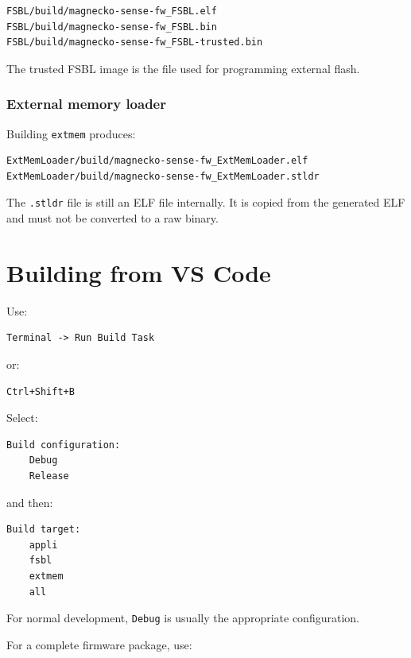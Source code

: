 \documentclass[10pt,a4paper,oneside]{report}
\begin{document}
\begin{verbatim}
FSBL/build/magnecko-sense-fw_FSBL.elf
FSBL/build/magnecko-sense-fw_FSBL.bin
FSBL/build/magnecko-sense-fw_FSBL-trusted.bin
\end{verbatim}

The trusted FSBL image is the file used for programming external flash.

\subsubsection{External memory loader}\label{wiki-getting-started-build-flash-debug--external-memory-loader}

Building \texttt{extmem} produces:

\begin{verbatim}
ExtMemLoader/build/magnecko-sense-fw_ExtMemLoader.elf
ExtMemLoader/build/magnecko-sense-fw_ExtMemLoader.stldr
\end{verbatim}

The \texttt{.\allowbreak{}stldr} file is still an ELF file internally. It is copied from the generated ELF and must not be converted to a raw binary.

\section{Building from VS Code}\label{wiki-getting-started-build-flash-debug--3-building-from-vs-code}

Use:

\begin{verbatim}
Terminal -> Run Build Task
\end{verbatim}

or:

\begin{verbatim}
Ctrl+Shift+B
\end{verbatim}

Select:

\begin{verbatim}
Build configuration:
    Debug
    Release
\end{verbatim}

and then:

\begin{verbatim}
Build target:
    appli
    fsbl
    extmem
    all
\end{verbatim}

For normal development, \texttt{Debug} is usually the appropriate configuration.

For a complete firmware package, use:
\end{document}
